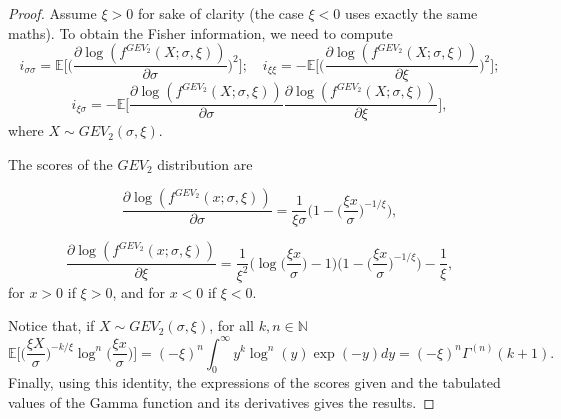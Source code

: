 \documentclass{article}
\newcommand{\mb}{\mathbb}
\newcommand{\1}{\mathds{1}}
\theoremstyle{definition}
\begin{document}
\begin{proof}[Proof]
     Assume $\xi > 0$ for sake of clarity (the case $\xi <0$ uses exactly the same maths). To obtain the Fisher information, we need to compute
    \begin{equation*}
        i_{\sigma\sigma} = \mb{E} \Big[\Big(\frac{\partial \log(f^{GEV_2}(X;\sigma,\xi))}{\partial \sigma}\Big)^2\Big]; \quad i_{\xi\xi} = -\mb{E} \Big[\Big(\frac{\partial \log(f^{GEV_2}(X;\sigma,\xi))}{\partial \xi}\Big)^2\Big];
        \end{equation*}
        \begin{equation*}
        i_{\xi\sigma} = -\mb{E} \Big[\frac{\partial \log(f^{GEV_2}(X;\sigma,\xi))}{\partial \sigma}\frac{\partial \log(f^{GEV_2}(X;\sigma,\xi))}{\partial \xi}\Big],
    \end{equation*}
    where $X\sim GEV_2(\sigma,\xi)$.
    
    \noindent The scores of the $GEV_2$ distribution are

    \begin{equation*}
        \frac{\partial\log(f^{GEV_2}(x;\sigma,\xi))}{\partial \sigma} = \frac{1}{\xi\sigma}\Big(1-\Big(\frac{\xi x}{\sigma}\Big)^{-1/\xi}\Big),
    \end{equation*}

    \begin{equation*}
        \frac{\partial\log(f^{GEV_2}(x;\sigma,\xi))}{\partial \xi} = \frac{1}{\xi^2}\Big(\log\Big(\frac{\xi x}{\sigma}\Big)-1\Big)\Big(1-\Big(\frac{\xi x}{\sigma}\Big)^{-1/\xi}\Big)-\frac{1}{\xi},
    \end{equation*}
for $x> 0$ if $\xi >0$, and for $x<0$ if $\xi <0$.
    
\noindent Notice that, if $X\sim GEV_2(\sigma,\xi)$, for all $k,n\in \mb{N}$
\begin{equation*}
    \mb{E}\Big[\Big(\frac{\xi X}{\sigma}\Big)^{-k/\xi}\log^n\Big(\frac{\xi x}{\sigma}\Big)\Big] %
    =(-\xi)^n\int_0^\infty y^k \log^n(y) \exp(-y) dy = (-\xi)^n\Gamma^{(n)}(k+1).
\end{equation*}
Finally, using this identity, the expressions of the scores given and the tabulated values of the Gamma function and its derivatives gives the results.





\end{proof}
\end{document}

